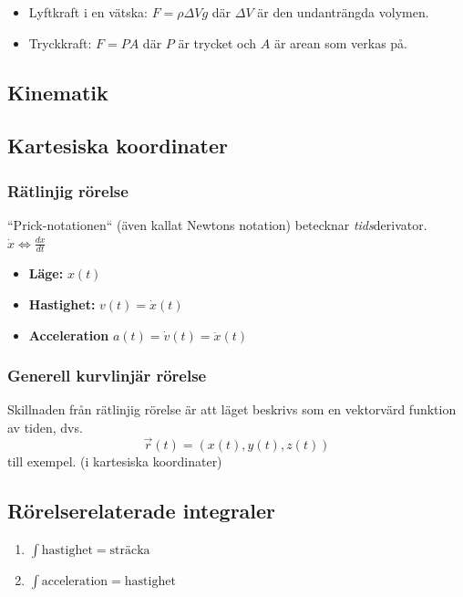 \documentclass{article}
\newenvironment{ankiflashcard}[1]{}{}
\newcommand{\midtitle}[1]{
\begin{center}
\Huge{\text{#1}}
\newpage
\end{center}
}
\begin{document}
\begin{ankiflashcard}{Ange formeln för lyftkraft och tryckkraft}
\begin{itemize}
    \item    Lyftkraft i en vätska: $F=\rho \Delta V g$ där $\Delta V$ är den undanträngda volymen.
    \item Tryckkraft: $F=PA$ där $P$ är trycket och $A$ är arean som verkas på.
\end{itemize}
\end{ankiflashcard}
\newpage
\midtitle{Dynamik}
\newpage
\begin{paracol}{2}
\section{Kinematik}
\subsection{Kartesiska koordinater}
\subsubsection{Rätlinjig rörelse}
``Prick-notationen`` (även kallat Newtons notation) betecknar \textit{tids}derivator. $\dot x \iff \frac{dx}{dt}$
\begin{itemize}
    \item \textbf{Läge:} $x(t)$
    \item \textbf{Hastighet:} $v(t)= \dot x(t)$
    \item \textbf{Acceleration} $a(t)=\dot v(t) = \ddot x(t)$
\end{itemize}
\subsubsection{Generell kurvlinjär rörelse}
Skillnaden från rätlinjig rörelse är att läget beskrivs som en vektorvärd funktion av tiden, dvs. $$\vec r(t)=(x(t),y(t),z(t))$$ till exempel. (i kartesiska koordinater)

\begin{ankiflashcard}{Hur kan man gå från t.ex. hastighet till att få sträckan med hjälp av differentialer?}
    
\subsection{Rörelserelaterade integraler}
\begin{enumerate}
    \item $\int \text{hastighet} = \text{sträcka}$
    \item $\int \text{acceleration} = \text{hastighet}$
\end{enumerate}
\end{ankiflashcard}


\end{paracol}
\end{document}
